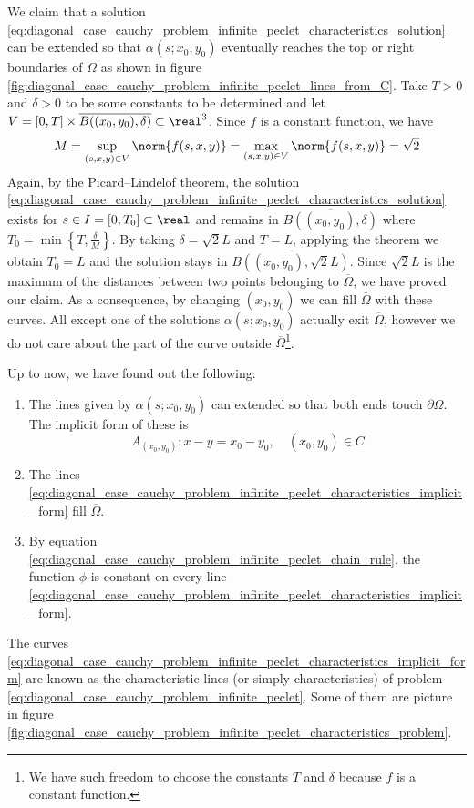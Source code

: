 We claim that a solution
\eqref{eq:diagonal_case_cauchy_problem_infinite_peclet_characteristics_solution}
can be extended so that $\alpha(s;x_0,y_0)$ eventually reaches the top or right
boundaries of $\Omega$ as shown in figure
\ref{fig:diagonal_case_cauchy_problem_infinite_peclet_lines_from_C}. Take $T >
0$ and $\delta > 0$ to be some constants to be determined and let $V = [0, T]
\times \overline{B((x_0,y_0), \delta)} \subset \real^3$. Since $f$ is a constant
function, we have
\begin{equation}
	M = 
	\sup_{(s,x,y) \in V} \norm{f(s,x,y)} = 
	\max_{(s,x,y) \in V} \norm{f(s,x,y)} = 
	\sqrt{2}
\end{equation} 
Again, by the Picard--Lindelöf theorem, the solution
\eqref{eq:diagonal_case_cauchy_problem_infinite_peclet_characteristics_solution}
exists for $s \in I = [0, T_0] \subset \real$ and remains in
$\overline{B((x_0,y_0), \delta)}$ where $T_0 = \min{\left\{ T, \frac{\delta}{M}
\right\}}$. By taking $\delta = \sqrt{2} L$ and $T = L$, applying the theorem we
obtain $T_0 = L$ and the solution stays in $\overline{B((x_0,y_0), \sqrt{2}
L)}$. Since $\sqrt{2} L$ is the maximum of the distances between two points
belonging to $\overline{\Omega}$, we have proved our claim. As a consequence, by
changing $(x_0,y_0)$ we can fill $\overline{\Omega}$ with these curves. All
except one of the solutions $\alpha(s;x_0,y_0)$ actually exit
$\overline{\Omega}$, however we do not care about the part of the curve outside
$\overline{\Omega}$\footnote{We have such freedom to choose the constants $T$
and $\delta$ because $f$ is a constant function.}.

Up to now, we have found out the following:
\begin{enumerate}[label={(\roman*)}, topsep=0pt]
	\item The lines given by $\alpha(s;x_0,y_0)$ can extended so that both ends
	touch $\partial \Omega$. The implicit form of these is
	\begin{equation} \label{eq:diagonal_case_cauchy_problem_infinite_peclet_characteristics_implicit_form}
		A_{(x_0,y_0)} \colon x - y = x_0 - y_0, \quad (x_0,y_0) \in C
	\end{equation}
	\item The lines
	\eqref{eq:diagonal_case_cauchy_problem_infinite_peclet_characteristics_implicit_form}
	fill $\overline{\Omega}$.
	\item By equation
	\eqref{eq:diagonal_case_cauchy_problem_infinite_peclet_chain_rule}, the
	function $\phi$ is constant on every line
	\eqref{eq:diagonal_case_cauchy_problem_infinite_peclet_characteristics_implicit_form}.
	\label{eq:infinite_peclet_point_2}
\end{enumerate}
The curves
\eqref{eq:diagonal_case_cauchy_problem_infinite_peclet_characteristics_implicit_form}
are known as the characteristic lines (or simply characteristics) of problem
\eqref{eq:diagonal_case_cauchy_problem_infinite_peclet}. Some of them are
picture in figure
\ref{fig:diagonal_case_cauchy_problem_infinite_peclet_characteristics_problem}.

